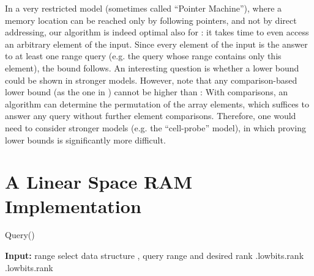\documentclass[a4paper,10pt]{article}
\begin{document}
In a very restricted model (sometimes called ``Pointer Machine''), where a memory location can be reached only by following pointers, and not by direct addressing, 
our algorithm is indeed optimal also for : it takes  time to even access an arbitrary element of the input.
Since every element of the input is the answer to at least one range query (e.g. the query whose range contains only this element), the bound follows.
An interesting question is whether a lower bound  could be shown in stronger models. However, note that any comparison-based lower bound (as the one in  \cite{DBLP:conf/esa/Har-PeledM08}) cannot be higher than : With  comparisons, an algorithm can determine the permutation of the array elements, which suffices to answer any query without further element comparisons.
Therefore, one would need to consider stronger models (e.g. the ``cell-probe'' model), in which proving
lower bounds is significantly more difficult.








\section{A Linear Space RAM Implementation}\label{s:RAM}


\begin{algorithm}\caption{Query()} \label{alg:linearquery}
\dontprintsemicolon
{\bf Input:} range select data structure , query range  and desired rank  \;
\lIf{}{\Return } \;
 .lowbits.rank  \;
 .lowbits.rank  \;
\\
\;   \end{algorithm}
\end{document}

